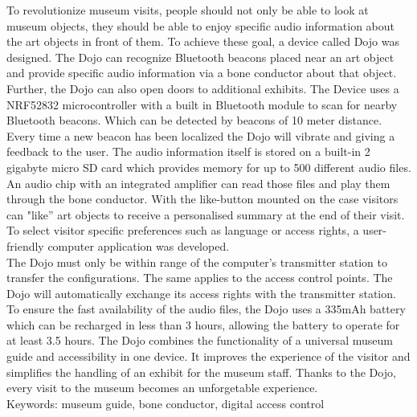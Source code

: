 To revolutionize museum visits, people should not only be able to look at museum objects, they should be able to enjoy specific audio information about the art objects in front of them. To achieve these goal, a device called Dojo was designed. The Dojo can recognize Bluetooth beacons placed near an art object and provide specific audio information via a bone conductor about that object. Further, the Dojo can also open doors to additional exhibits. The Device uses a NRF52832 microcontroller with a built in Bluetooth module to scan for nearby Bluetooth beacons. Which can be detected by beacons of 10 meter distance.\\ Every time a new beacon has been localized the Dojo will vibrate and giving a feedback to the user. The audio information itself is stored on a built-in 2 gigabyte micro SD card which provides memory for up to 500 different audio files. An audio chip with an integrated amplifier can read those files and play them through the bone conductor. With the like-button mounted on the case visitors can "like'' art objects to receive a personalised summary at the end of their visit. To select visitor specific preferences such as language or access rights, a user-friendly computer application was developed.\\ The Dojo must only be within range of the computer's transmitter station to transfer the configurations. The same applies to the access control points. The Dojo will automatically exchange its access rights with the transmitter station. To ensure the fast availability of the audio files, the Dojo uses a 335mAh battery which can be recharged in less than 3 hours, allowing the battery to operate for at least 3.5 hours. The Dojo combines the functionality of a universal museum guide and accessibility in one device. It improves the experience of the visitor and simplifies the handling of an exhibit for the museum staff. Thanks to the Dojo, every visit to the museum becomes an unforgetable experience.\\
Keywords: museum guide, bone conductor, digital access control

